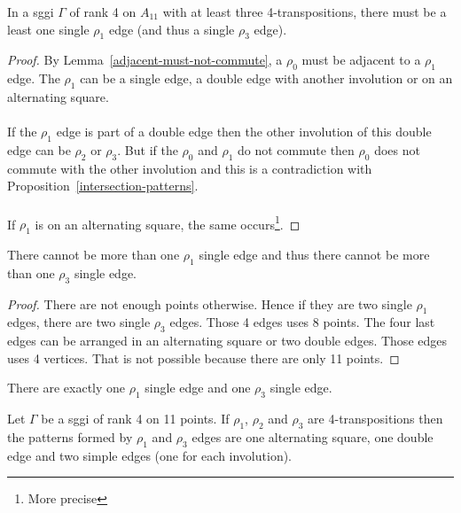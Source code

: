 \begin{lemma}
  In a sggi $\Gamma$ of rank 4 on $A_{11}$ with at least three 4-transpositions, there must be a least one single $\rho_1$ edge (and thus a single $\rho_3$ edge).
\end{lemma}

\begin{proof}
  By Lemma~\ref{adjacent-must-not-commute}, a $\rho_0$ must be adjacent to a $\rho_1$ edge. The $\rho_1$ can be a single edge, a double edge with another involution or on an alternating square.

  \paragraph{}
  If the $\rho_1$ edge is part of a double edge then the other involution of this double edge can be $\rho_2$ or $\rho_3$. But if the $\rho_0$ and $\rho_1$ do not commute then $\rho_0$ does not commute with the other involution and this is a contradiction with Proposition~\ref{intersection-patterns}.

  \paragraph{}
  If $\rho_1$ is on an alternating square, the same occurs\footnote{More precise}.

\end{proof}

\begin{lemma}
  There cannot be more than one $\rho_1$ single edge and thus there cannot be more than one $\rho_3$ single edge.
\end{lemma}

\begin{proof}
  There are not enough points otherwise. Hence if they are two single $\rho_1$ edges, there are two single $\rho_3$ edges. Those 4 edges uses 8 points. The four last edges can be arranged in an alternating square or two double edges. Those edges uses 4 vertices. That is not possible because there are only 11 points.
\end{proof}

\begin{corollary}
  \label{rank-4-single-1}
  There are exactly one $\rho_1$ single edge and one $\rho_3$ single edge.
\end{corollary}

\begin{lemma}
  \label{rank-4-3-patterns}
  Let $\Gamma$ be a sggi of rank 4 on 11 points. If $\rho_1$, $\rho_2$ and $\rho_3$ are 4-transpositions then the patterns formed by $\rho_1$ and $\rho_3$ edges are one alternating square, one double edge and two simple edges (one for each involution).
\end{lemma}

